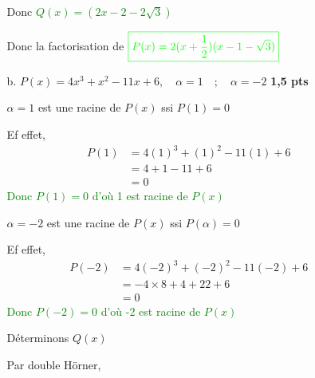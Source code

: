 \documentclass[12pt]{article}
\begin{document}
\begin{itemize}
\begin{itemize}
Donc \underline{\textcolor{green}{$Q(x)=(2x-2-2\sqrt{3})$}}

Donc la factorisation de $\textcolor{green}{\boxed{P(x)=2(x+\frac{1}{2})(x-1-\sqrt{3})}}$

\item[b.] $P(x)=4x^{3}+x^{2}-11x+6,\quad \alpha=1\quad;\quad \alpha=-2$ \textbf{1,5 pts}

$\alpha=1$ est une racine de $P(x)$ ssi $P(1)=0$

Ef effet, 
\begin{align*}
P(1)&=4(1)^{3}+(1)^{2}-11(1)+6\\
	&=4+1-11+6\\
	&=0
\end{align*}
\textcolor{green}{Donc $P(1)=0$ d'où 1 est racine de $P(x)$}

$\alpha=-2$ est une racine de $P(x)$ ssi $P(\alpha)=0$

Ef effet, 
\begin{align*}
P(-2)&=4(-2)^{3}+(-2)^{2}-11(-2)+6\\
	&=-4\times 8+4+22+6\\
	&=0
\end{align*}
\textcolor{green}{Donc $P(-2)=0$ d'où -2 est racine de $P(x)$}

Déterminons $Q(x)$

Par double Hörner,


\end{itemize}
\end{itemize}
\end{document}
